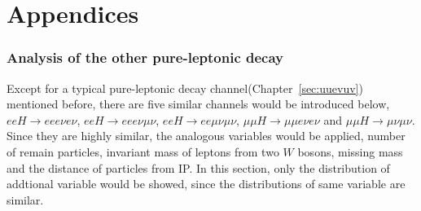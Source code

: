 \documentclass[11pt,a4paper]{cepcnote}
\begin{document}
\newpage
\appendix
\part*{Appendices}

%
\section{Analysis of the other pure-leptonic decay}
\label{app:eeevev}
Except for  a typical pure-leptonic decay channel(Chapter~\ref{sec:uuevuv}) mentioned before,
there are five similar channels would be introduced below, $eeH \to eee\nu e\nu$, $eeH \to eee\nu\mu\nu$, $eeH\to ee\mu\nu\mu\nu$, 
$\mu\mu H \to \mu\mu e\nu e\nu$ and $\mu\mu H \to \mu\nu\mu\nu$.
Since they are highly similar, the analogous variables would be applied, number of remain particles, invariant mass of leptons 
from two $W$ bosons, missing mass and the distance of particles from IP.
In this section, only the distribution of addtional variable would be showed, since the distributions of same variable are similar.
\end{document}
